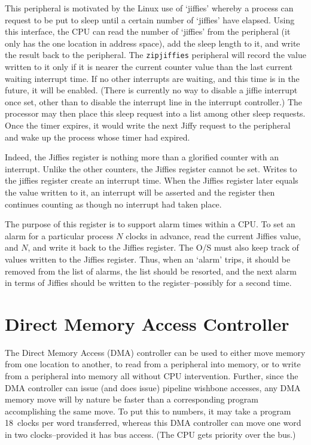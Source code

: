 \documentclass{gqtekspec}
\begin{document}
This peripheral is motivated by the Linux use of `jiffies' whereby a process
can request to be put to sleep until a certain number of `jiffies' have
elapsed.  Using this interface, the CPU can read the number of `jiffies'
from the peripheral (it only has the one location in address space), add the
sleep length to it, and write the result back to the peripheral.  The
{\tt zipjiffies}
peripheral will record the value written to it only if it is nearer the current
counter value than the last current waiting interrupt time.  If no other 
interrupts are waiting, and this time is in the future, it will be enabled.
(There is currently no way to disable a jiffie interrupt once set, other
than to disable the interrupt line in the interrupt controller.)  The processor
may then place this sleep request into a list among other sleep requests.
Once the timer expires, it would write the next Jiffy request to the peripheral
and wake up the process whose timer had expired.

Indeed, the Jiffies register is nothing more than a glorified counter with
an interrupt.  Unlike the other counters, the Jiffies register cannot be set.
Writes to the jiffies register create an interrupt time.  When the Jiffies
register later equals the value written to it, an interrupt will be asserted
and the register then continues counting as though no interrupt had taken
place.

The purpose of this register is to support alarm times within a CPU.  To
set an alarm for a particular process $N$ clocks in advance, read the current
Jiffies value, and $N$, and write it back to the Jiffies register.  The
O/S must also keep track of values written to the Jiffies register.  Thus,
when an `alarm' trips, it should be removed from the list of alarms, the list
should be resorted, and the next alarm in terms of Jiffies should be written
to the register--possibly for a second time.

\section{Direct Memory Access Controller}

The Direct Memory Access (DMA) controller can be used to either move memory
from one location to another, to read from a peripheral into memory, or to
write from a peripheral into memory all without CPU intervention.  Further,
since the DMA controller can issue (and does issue) pipeline wishbone accesses,
any DMA memory move will by nature be faster than a corresponding program
accomplishing the same move.  To put this to numbers, it may take a program
18~clocks per word transferred, whereas this DMA controller can move one
word in two clocks--provided it has bus access.  (The CPU gets priority over
the bus.)
\end{document}
